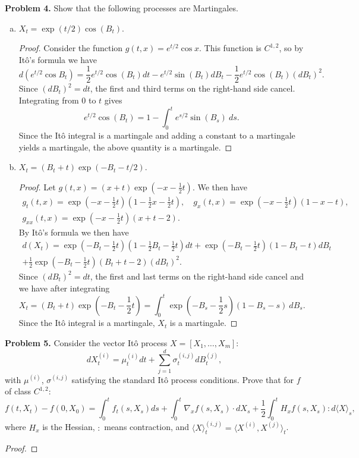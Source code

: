 \documentclass[11pt,letterpaper]{report}
\begin{document}
\noindent\textbf{Problem 4. }
Show that the following processes are Martingales.
\begin{enumerate}[a)]
	\item $X_t = \exp(t/2)\cos(B_t)$.
	\begin{proof}
		Consider the function $g(t, x) = e^{t/2}\cos x$. This function is $C^{1, 2}$, so by It\^o's formula we have
		\[
		d(e^{t/2}\cos B_t) = \frac{1}{2}e^{t/2}\cos(B_t)dt - e^{t/2}\sin(B_t)dB_t - \frac{1}{2}e^{t/2}\cos(B_t)(dB_t)^2.
		\]
		Since $(dB_t)^2 = dt$, the first and third terms on the right-hand side cancel. Integrating from $0$ to $t$ gives
		\[
		e^{t/2}\cos(B_t) = 1 - \int_0^te^{s/2}\sin(B_s)\ ds.
		\]
		Since the It\^o integral is a martingale and adding a constant to a martingale yields a martingale, the above quantity is a martingale.
	\end{proof}
	\item $X_t = (B_t+t)\exp(-B_t-t/2)$.
	\begin{proof}
		Let $g(t, x) = (x+t)\exp(-x-\frac{1}{2}t)$. We then have
		\begin{gather*}
		g_t(t, x) = \exp\left(-x-\frac{1}{2}t\right)\left(1-\frac{1}{2}x-\frac{1}{2}t\right),\quad g_x(t, x) = \exp\left(-x-\frac{1}{2}t\right)(1-x-t),\\
		g_{xx}(t, x) = \exp\left(-x-\frac{1}{2}t\right)(x+t-2).
		\end{gather*}
		By It\^o's formula we then have
		\begin{multline*}
		d(X_t) = \exp\left(-B_t-\frac{1}{2}t\right)\left(1-\frac{1}{2}B_t-\frac{1}{2}t\right)dt+ \exp\left(-B_t-\frac{1}{2}t\right)(1-B_t-t)dB_t\\
		 + \frac{1}{2}\exp\left(-B_t-\frac{1}{2}t\right)(B_t+t-2)(dB_t)^2.
		\end{multline*}
		Since $(dB_t)^2 = dt$, the first and last terms on the right-hand side cancel and we have after integrating
		\[
		X_t = (B_t+t)\exp\left(-B_t-\frac{1}{2}t\right) = \int_0^t\exp\left(-B_s-\frac{1}{2}s\right)(1-B_s-s)\ dB_s.
		\]
		Since the It\^o integral is a martingale, $X_t$ is a martingale.
	\end{proof}
\end{enumerate}

\noindent\textbf{Problem 5. }
Consider the vector It\^o process $X=[X_1, \ldots, X_m]$:
\[
dX_t^{(i)} = \mu_t^{(i)}dt + \sum_{j=1}^d\sigma^{(i,j)}_tdB_t^{(j)},
\]
with $\mu^{(i)}$, $\sigma^{(i,j)}$ satisfying the standard It\^o process conditions. Prove that for $f$ of class $C^{1,2}$:
\[
f(t, X_t)-f(0, X_0) = \int_0^tf_t(s, X_s)ds + \int_0^t\nabla_xf(s, X_s)\cdot dX_s + \frac{1}{2}\int_0^tH_xf(s, X_s):d\langle X\rangle_s,
\]
where $H_x$ is the Hessian, $:$ means contraction, and $\langle X\rangle^{(i,j)}_t = \langle X^{(i)}, X^{(j)}\rangle_t$.
\begin{proof}
	
\end{proof}
\end{document}
